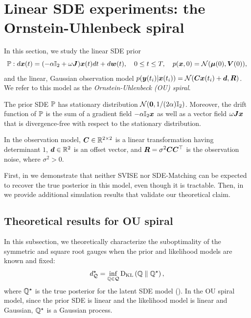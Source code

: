 \section{Linear SDE experiments: the Ornstein-Uhlenbeck spiral}\label{app:sec:ou-spiral}
In this section, we study the linear SDE prior
\begin{equation}\label{app:eqn:ou-spiral}
    \mathbb{P}: d\boldsymbol{x}(t) = (-\alpha \mathbb{I}_2 + \omega \boldsymbol{J}) \boldsymbol{x}(t) dt + d\boldsymbol{w}(t), \quad 0 \leq t \leq T, \quad p(\boldsymbol{x}, 0) = \mathcal{N}(\boldsymbol{\mu}(0), \boldsymbol{V}(0)),
\end{equation}
and the linear, Gaussian observation model $p(\boldsymbol{y}(t_i)| \boldsymbol{x}(t_i)) = \mathcal{N}(\boldsymbol{C} \boldsymbol{x}(t_i) + \boldsymbol{d}, \boldsymbol{R})$. We refer to this model as the \emph{Ornstein-Uhlenbeck (OU) spiral}. 

The prior SDE $\mathbb{P}$ has stationary distribution $\mathcal{N}(\boldsymbol{0}, 1/(2\alpha)\mathbb{I}_2)$.
Moreover, the drift function of $\mathbb{P}$ is the sum of a gradient field $-\alpha \mathbb{I}_2\boldsymbol{x}$ as well as a vector field $\omega\boldsymbol{J}\boldsymbol{x}$ that is divergence-free with respect to the stationary distribution.

In the observation model, $\boldsymbol{C} \in \mathbb{R}^{2 \times 2}$ is a linear transformation having determinant $1$, $\boldsymbol{d} \in \mathbb{R}^2$ is an offset vector, and $\boldsymbol{R} = \sigma^2 \boldsymbol{C} \boldsymbol{C}^\top$ is the observation noise, where $\sigma^2 > 0$.

First, in  we demonstrate that neither SVISE \cite{course2023state, course2023amortized} nor SDE-Matching \cite{bartosh2025sde} can be expected to recover the true posterior in this model, even though it is tractable. 
Then, in  we provide additional simulation results that validate our theoretical claim.  

\subsection{Theoretical results for OU spiral}\label{app:subsec:ou-theory}

In this subsection, we theoretically characterize the suboptimality of the symmetric and square root gauges when the prior and likelihood models are known and fixed:
\begin{equation}\label{app:eqn:kl-gap}
    d_{\mathcal{Q}}^\star = \inf_{\mathbb{Q} \in \mathcal{Q}} \textrm{D}_{\textrm{KL}}\left(\mathbb{Q}\;\|\;\mathbb{Q}^\star\right),
\end{equation}
where $\mathbb{Q}^\star$ is the true posterior for the latent SDE model ().
In the OU spiral model, since the prior SDE is linear and the likelihood model is linear and Gaussian, $\mathbb{Q}^\star$ is a Gaussian process. 


